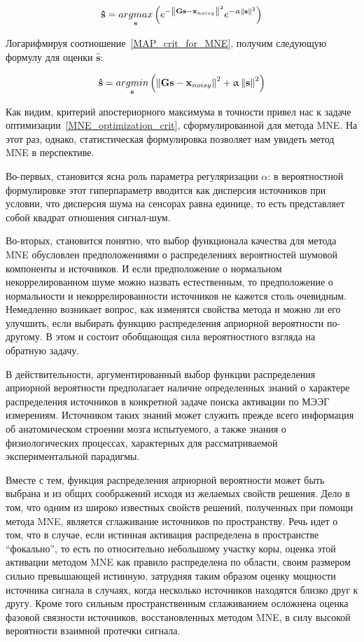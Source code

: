 \begin{equation}
    \mathbf{\hat{s}} =
    \underset{\mathbf{s}}{argmax} \left(
        e^{-\left\lVert\mathbf{Gs - x}_{noisy}\right\rVert^2} e^{-\upalpha\left\lVert\mathbf{s}\right\rVert^2}
    \right)
    \label{MAP_crit_for_MNE}
\end{equation}

Логарифмируя соотношение~\ref{MAP_crit_for_MNE}, получим следующую формулу
для оценки $\mathbf{\hat{s}}$:

\begin{equation}
    \mathbf{\hat{s}} =
    \underset{\mathbf{s}}{argmin} \left(
        \left\lVert\mathbf{Gs - x}_{noisy}\right\rVert^2 + \upalpha\left\lVert\mathbf{s}\right\rVert^2
    \right)
    \label{logMAP_crit_for_MNE}
\end{equation}

Как видим, критерий апостериорного максимума в точности привел нас
к задаче оптимизации~\ref{MNE_optimization_crit}, сформулированной для
метода MNE. На этот раз, однако, статистическая формулировка позволяет
нам увидеть метод MNE в перспективе.

Во-первых, становится ясна роль параметра регуляризации $\alpha$:
в вероятностной формулировке этот гиперпараметр вводится как дисперсия
источников при условии, что дисперсия шума на сенсорах равна единице,
то есть представляет собой квадрат отношения сигнал-шум.

Во-вторых, становится понятно, что выбор функционала качества для метода MNE
обусловлен предположениями о распределениях вероятностей шумовой компоненты и
источников. И если предположение о нормальном некоррелированном шуме можно
назвать естественным, то предположение о нормальности и некоррелированности
источников не кажется столь очевидным.  Немедленно возникает вопрос, как
изменятся свойства метода и можно ли его улучшить, если выбирать функцию
распределения априорной вероятности по-другому. В этом и состоит обобщающая
сила вероятностного взгляда на обратную задачу.

В действительности, аргументированный выбор функции распределения априорной
вероятности предполагает наличие определенных знаний о характере распределения
источников в конкретной задаче поиска активации по МЭЭГ измерениям. Источником
таких знаний может служить прежде всего информация об анатомическом строении
мозга испытуемого, а также знания о физиологических процессах, характерных для
рассматриваемой экспериментальной парадигмы.

Вместе с тем, функция распределения априорной вероятности может быть выбрана и из
общих соображений исходя из желаемых свойств решения. Дело в том, что одним из
широко известных свойств решений, полученных при помощи метода MNE, является
сглаживание источников по пространству. Речь идет о том, что в случае,
если истинная активация распределена в пространстве ``фокально'', то есть
по относительно небольшому участку коры, оценка этой активации методом
MNE как правило распределена по области, своим размером сильно превышающей
истинную, затрудняя таким образом оценку мощности источника сигнала в
случаях, когда несколько источников находятся близко друг к другу.
Кроме того сильным пространственным сглаживанием осложнена оценка фазовой
связности источников, восстановленных методом MNE, в силу высокой вероятности
взаимной протечки сигнала.

